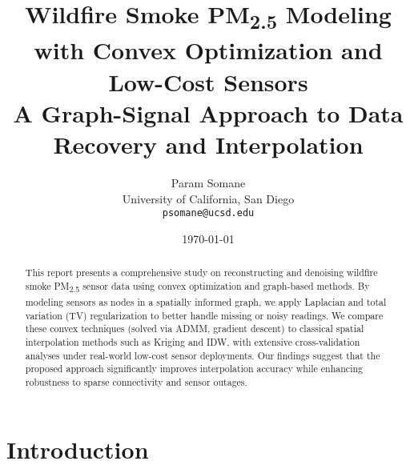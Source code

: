 \documentclass[12pt]{article}                                %
\begin{document}

\title{\textbf{Wildfire Smoke PM\textsubscript{2.5} Modeling with Convex Optimization and Low-Cost Sensors}\\   %
       \large A Graph-Signal Approach to Data Recovery and Interpolation}                                   %

\author{Param Somane \\                                   %
        \small{University of California, San Diego} \\    %
        \small{\texttt{psomane@ucsd.edu}}}                %

\date{\today}                                             %
\maketitle                                                %

\begin{abstract}                                          %
This report presents a comprehensive study on reconstructing and denoising wildfire smoke 
PM\textsubscript{2.5} sensor data using convex optimization and graph-based methods. By 
modeling sensors as nodes in a spatially informed graph, we apply Laplacian and total variation (TV) 
regularization to better handle missing or noisy readings. We compare these convex techniques 
(solved via ADMM, gradient descent) to classical spatial interpolation methods such as Kriging 
and IDW, with extensive cross-validation analyses under real-world low-cost sensor deployments. 
Our findings suggest that the proposed approach significantly improves interpolation accuracy 
while enhancing robustness to sparse connectivity and sensor outages.
\end{abstract}

\tableofcontents                                         %

\section{Introduction}
\label{sec:intro}                                        %
\end{document}
